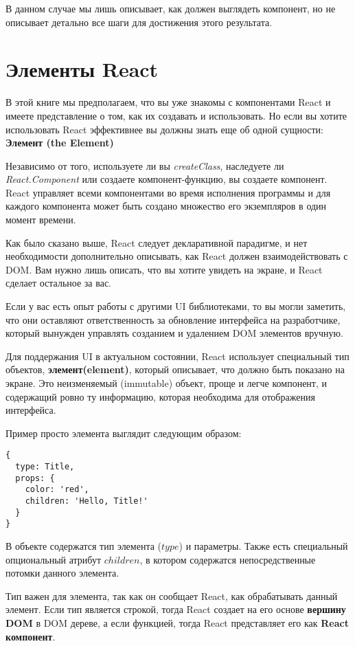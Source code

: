 В данном случае мы лишь описывает, как должен выглядеть компонент, но не описывает детально все шаги для достижения этого результата.

\section{Элементы React}

В этой книге мы предполагаем, что вы уже знакомы с компонентами React и имеете представление о том, как их создавать и использовать. Но если вы хотите использовать React эффективнее вы должны знать еще об одной сущности: \textbf{Элемент (the Element)}

Независимо от того, используете ли вы \textit{createClass}, наследуете ли \textit{React.Component} или создаете компонент-функцию, вы создаете компонент. React управляет всеми компонентами во время исполнения программы и для каждого компонента может быть создано множество его экземпляров в один момент времени.

Как было сказано выше, React следует декларативной парадигме, и нет необходимости дополнительно описывать, как React должен взаимодействовать с DOM. Вам нужно лишь описать, что вы хотите увидеть на экране, и React сделает остальное за вас.

Если у вас есть опыт работы с другими UI библиотеками, то вы могли заметить, что они оставляют ответственность за обновление интерфейса на разработчике, который вынужден управлять созданием и удалением DOM элементов вручную.

Для поддержания UI в актуальном состоянии, React использует специальный тип объектов, \textbf{элемент(element)}, который описывает, что должно быть показано на экране. Это неизменяемый (immutable) объект, проще и легче компонент, и содержащий ровно ту информацию, которая необходима для отображения интерфейса.

Пример просто элемента выглядит следующим образом:

\begin{lstlisting}
{
  type: Title,
  props: {
    color: 'red',
    children: 'Hello, Title!'
  }
}
\end{lstlisting}

В объекте содержатся тип элемента ($type$) и параметры. Также есть специальный опциональный атрибут $children$, в котором содержатся непосредственные потомки данного элемента.

Тип важен для элемента, так как он сообщает React, как обрабатывать данный элемент. Если тип является строкой, тогда React создает на его основе \textbf{вершину DOM} в DOM дереве, а если функцией, тогда React представляет его как \textbf{React компонент}.

